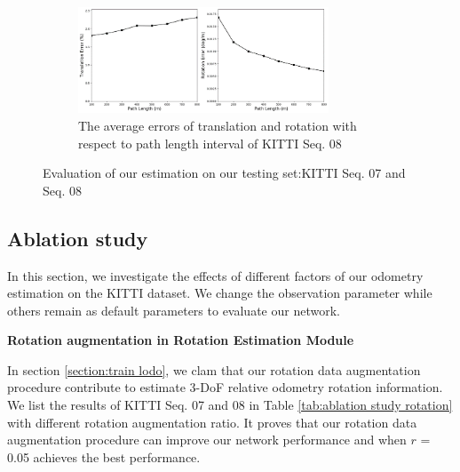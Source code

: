 \documentclass[sigconf]{acmart}
\begin{document}
\begin{figure}[h]
     \begin{subfigure}[b]{\columnwidth}
         \centering
         \includegraphics[width=0.82\textwidth]{Figures/error8.png}
         \caption{The average errors of translation and rotation with respect to path length interval of KITTI Seq. 08}
         \label{fig:evaluation c}
     \end{subfigure}
     
        \caption{Evaluation of our estimation on our testing set:KITTI Seq. 07 and Seq. 08}
        \label{fig:evaluation}
\end{figure}


\subsection{Ablation study}
In this section, we investigate the effects of different factors of our odometry estimation on the KITTI dataset. We change the observation parameter while others remain as default parameters to evaluate our network.

\noindent
 \textbf{Rotation augmentation in Rotation Estimation Module}

In section \ref{section:train lodo}, we clam that our rotation data augmentation procedure contribute to estimate 3-DoF relative odometry rotation information. We list the results of KITTI Seq. 07 and 08 in Table \ref{tab:ablation study rotation} with different rotation augmentation ratio. It proves that our rotation data augmentation procedure can improve our network performance and when $r$ = 0.05 achieves the best performance. 
\end{document}
